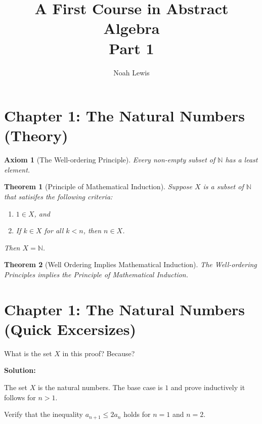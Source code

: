 \documentclass[8pt]{article}
\title{A First Course in Abstract Algebra \\ Part 1}
\author{Noah Lewis}
\newtheorem{axiom}{Axiom}
\newtheorem{theorem}{Theorem}
\begin{document}
\maketitle

\tableofcontents

\section{Chapter 1: The Natural Numbers (Theory)}

\begin{axiom}[The Well-ordering Principle]
Every non-empty subset of $\mathbb{N}$
    has a least element.
\end{axiom}

\begin{theorem}[Principle of Mathematical Induction]
Suppose $X$ is a subset of $\mathbb{N}$
    that satisifes the following criteria:

    \begin{enumerate}
        \item $1 \in X$, and
        \item If $k \in X$ for all $k < n$, then $n \in X$.
    \end{enumerate}

    Then $X = \mathbb{N}$.
\end{theorem}

\begin{theorem}[Well Ordering Implies Mathematical Induction]
    The Well-ordering Principles implies the Principle of Mathematical Induction.
\end{theorem}

\section{Chapter 1: The Natural Numbers (Quick Excersizes)}

\begin{tcolorbox}[title=Quick Excerisize 1, breakable]
    What is the set $X$ in this proof? Because?
\end{tcolorbox}

\textbf{Solution:}

The set $X$ is the natural numbers. The base case is $1$
and prove inductively it follows for $n > 1$.

\begin{tcolorbox}[title=Quick Excerisize 2, breakable]
    Verify that the inequality $a_{n + 1} \le 2a_n$
    holds for $n = 1$ and $n = 2$.
\end{tcolorbox}
\end{document}
